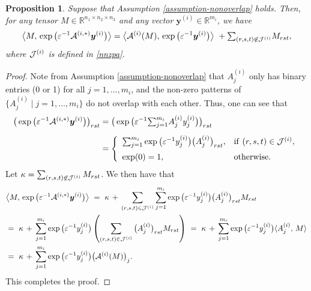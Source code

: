 \documentclass[10pt]{article}
\newcommand{\cJ}{{\cal J}}
\newcommand{\cA}{{\cal A}}
\newcommand{\inprod}[2]{\langle #1 , #2 \rangle }
\newcommand{\R}{\mathbb R}
\newtheorem{proposition}{Proposition}
\def\inprod#1#2{\langle#1,\,#2\rangle}
\begin{document}
\begin{proposition}\label{prop-key}
Suppose that Assumption \ref{assumption-nonoverlap} holds. Then, for any tensor $M\in \R^{n_1\times n_2\times n_3}$ and any vector $\bm{y}^{(i)}\in \R^{m_i}$, we have
\begin{equation*}%
\big\langle M, \,\exp\big( \varepsilon^{-1}\cA^{(i,*)}\bm{y}^{(i)} \big)\big\rangle
= \big\langle \cA^{(i)}(M), \,\exp\big( \varepsilon^{-1}\bm{y}^{(i)} \big) \big\rangle
~+ {\textstyle\sum_{(r,s,t)\not\in \cJ^{(i)}}} M_{rst},
\end{equation*}
where $\cJ^{(i)}$ is defined in \eqref{nnzpa}.
\end{proposition}
\begin{proof}
Note from Assumption \ref{assumption-nonoverlap} that $A_j^{(i)}$ only has binary entries (0 or 1) for all $j = 1,\dots,m_i$, and the non-zero patterns of $\big\{ A_j^{(i)} \mid j = 1,\dots,m_i \big\}$ do not overlap with each other. Thus, one can see that
\begin{equation*}
\begin{aligned}
\big(\exp\big( \varepsilon^{-1}\cA^{(i,*)}\bm{y}^{(i)} \big) \big)_{rst}
&=\big(\exp\big( \varepsilon^{-1} {\textstyle\sum_{j=1}^{m_i}}  A_j^{(i)}y_j^{(i)}  \big)\big)_{rst} \vspace{2mm}\\[5pt]
&=\left\{\begin{array}{ll}
{\textstyle\sum_{j=1}^{m_i}} \exp\big(  \varepsilon^{-1}y_j^{(i)} \big)  \big(A_j^{(i)}\big)_{rst}, &\mathrm{if}~(r,s,t)\in \cJ^{(i)}, \vspace{2mm}\\
\exp(0) = 1, & \mathrm{otherwise}.
\end{array}\right.
\end{aligned}
\end{equation*}
 Let $\kappa = \sum_{(r,s,t)\not\in \cJ^{(i)}} M_{rst}$. We then have that
\begin{equation*}
\begin{aligned}
&\big\langle M, \,\exp\big( \varepsilon^{-1}\cA^{(i,*)}\bm{y}^{(i)} \big) \big\rangle
~=~ \kappa \,+\, \sum_{(r,s,t)\in \cJ^{(i)}}  \sum_{j=1}^{m_i} \exp\big(  \varepsilon^{-1}y_j^{(i)} \big) \big(A_j^{(i)}\big)_{rst} M_{rst}
\\
&=~ \kappa \,+\, \sum_{j=1}^{m_i} \exp\big(\varepsilon^{-1}y_j^{(i)} \big)
\left(\sum_{(r,s,t)\in \cJ^{(i)}} \big(A_j^{(i)}\big)_{rst} M_{rst} \right)
~=~ \kappa \,+\, \sum_{j=1}^{m_i} \exp\big(\varepsilon^{-1}y_j^{(i)} \big)  \inprod{A^{(i)}_j}{M} \\
&=~ \kappa \,+\, \sum_{j=1}^{m_i} \exp\big(\varepsilon^{-1}y_j^{(i)} \big)  \big(\cA^{(i)} (M) \big)_j.
\end{aligned}
\end{equation*}
This completes the proof.
\end{proof}
\end{document}
